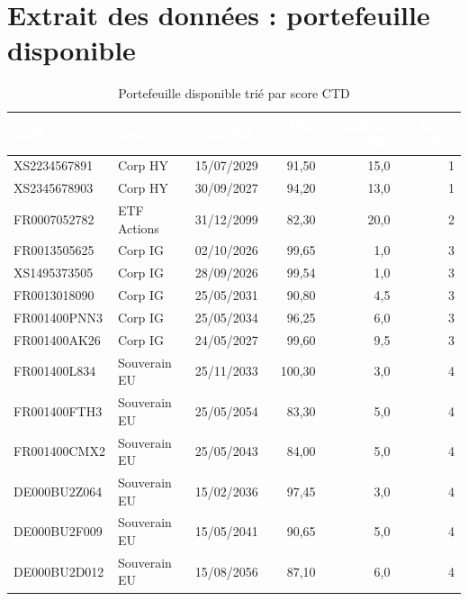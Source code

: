 \documentclass[12pt,a4paper]{article}
\begin{document}
\section{Extrait des données : portefeuille disponible}

\begin{table}[H]
\centering
\small
\renewcommand{\arraystretch}{1.2}
\begin{tabularx}{\linewidth}{p{2.8cm} p{3cm} p{2cm} r r r}
\toprule
\rowcolor{natixisBlue}
\textcolor{white}{\textbf{ISIN}} &
\textcolor{white}{\textbf{Type}} &
\textcolor{white}{\textbf{Maturité}} &
\textcolor{white}{\textbf{Prix (\%)}} &
\textcolor{white}{\textbf{Haircut (\%)}} &
\textcolor{white}{\textbf{Score CTD}} \\
\midrule
\rowcolor{accentRedBg}
XS2234567891 & Corp HY & 15/07/2029 & 91,50 & 15,0 & 1 \\
\rowcolor{accentRedBg}
XS2345678903 & Corp HY & 30/09/2027 & 94,20 & 13,0 & 1 \\
\rowcolor{accentOrangeBg}
FR0007052782 & ETF Actions & 31/12/2099 & 82,30 & 20,0 & 2 \\
\rowcolor{natixisGray}
FR0013505625 & Corp IG & 02/10/2026 & 99,65 & 1,0 & 3 \\
\rowcolor{natixisGray}
XS1495373505 & Corp IG & 28/09/2026 & 99,54 & 1,0 & 3 \\
\rowcolor{natixisGray}
FR0013018090 & Corp IG & 25/05/2031 & 90,80 & 4,5 & 3 \\
\rowcolor{natixisGray}
FR001400PNN3 & Corp IG & 25/05/2034 & 96,25 & 6,0 & 3 \\
\rowcolor{natixisGray}
FR001400AK26 & Corp IG & 24/05/2027 & 99,60 & 9,5 & 3 \\
\rowcolor{accentGreenBg}
FR001400L834 & Souverain EU & 25/11/2033 & 100,30 & 3,0 & 4 \\
\rowcolor{accentGreenBg}
FR001400FTH3 & Souverain EU & 25/05/2054 & 83,30 & 5,0 & 4 \\
\rowcolor{accentGreenBg}
FR001400CMX2 & Souverain EU & 25/05/2043 & 84,00 & 5,0 & 4 \\
\rowcolor{accentGreenBg}
DE000BU2Z064 & Souverain EU & 15/02/2036 & 97,45 & 3,0 & 4 \\
\rowcolor{accentGreenBg}
DE000BU2F009 & Souverain EU & 15/05/2041 & 90,65 & 5,0 & 4 \\
\rowcolor{accentGreenBg}
DE000BU2D012 & Souverain EU & 15/08/2056 & 87,10 & 6,0 & 4 \\
\bottomrule
\end{tabularx}
\caption{Portefeuille disponible trié par score CTD}
\end{table}
\end{document}
